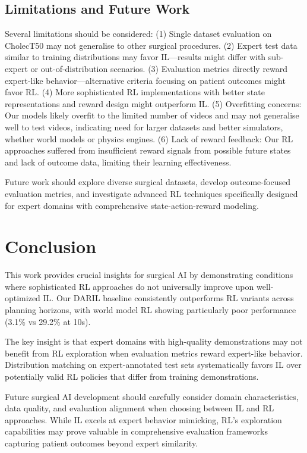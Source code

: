 \documentclass[runningheads]{llncs}
\begin{document}
\subsection{Limitations and Future Work}

Several limitations should be considered: (1) Single dataset evaluation on CholecT50 may not generalise to other surgical procedures. (2) Expert test data similar to training distributions may favor IL—results might differ with sub-expert or out-of-distribution scenarios. (3) Evaluation metrics directly reward expert-like behavior—alternative criteria focusing on patient outcomes might favor RL. (4) More sophisticated RL implementations with better state representations and reward design might outperform IL. (5) Overfitting concerns: Our models likely overfit to the limited number of videos and may not generalise well to test videos, indicating need for larger datasets and better simulators, whether world models or physics engines. (6) Lack of reward feedback: Our RL approaches suffered from insufficient reward signals from possible future states and lack of outcome data, limiting their learning effectiveness.

Future work should explore diverse surgical datasets, develop outcome-focused evaluation metrics, and investigate advanced RL techniques specifically designed for expert domains with comprehensive state-action-reward modeling.

\section{Conclusion}

This work provides crucial insights for surgical AI by demonstrating conditions where sophisticated RL approaches do not universally improve upon well-optimized IL. Our DARIL baseline consistently outperforms RL variants across planning horizons, with world model RL showing particularly poor performance (3.1\% vs 29.2\% at 10s).

The key insight is that expert domains with high-quality demonstrations may not benefit from RL exploration when evaluation metrics reward expert-like behavior. Distribution matching on expert-annotated test sets systematically favors IL over potentially valid RL policies that differ from training demonstrations.

Future surgical AI development should carefully consider domain characteristics, data quality, and evaluation alignment when choosing between IL and RL approaches. While IL excels at expert behavior mimicking, RL's exploration capabilities may prove valuable in comprehensive evaluation frameworks capturing patient outcomes beyond expert similarity.
\end{document}
